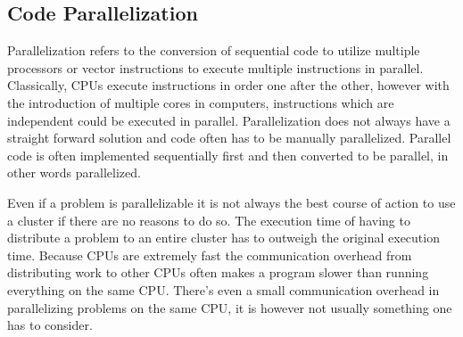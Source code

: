 \documentclass[12pt, a4paper]{article}
\begin{document}
\subsection{Code Parallelization}

Parallelization refers to the conversion of sequential code to utilize multiple processors or vector instructions to execute multiple instructions in parallel.
Classically, CPUs execute instructions in order one after the other, however with the introduction of multiple cores in computers, instructions which are independent could be executed in parallel.
Parallelization does not always have a straight forward solution and code often has to be manually parallelized.
Parallel code is often implemented sequentially first and then converted to be parallel, in other words parallelized.

Even if a problem is parallelizable it is not always the best course of action to use a cluster if there are no reasons to do so.
The execution time of having to distribute a problem to an entire cluster has to outweigh the original execution time.
Because CPUs are extremely fast the communication overhead from distributing work to other CPUs often makes a program slower than running everything on the same CPU.
There's even a small communication overhead in parallelizing problems on the same CPU, it is however not usually something one has to consider.


\end{document}
